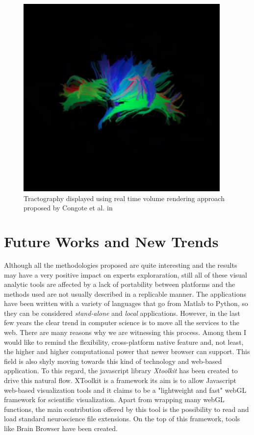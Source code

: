 \documentclass{article}
\begin{document}
\begin{multicols}{2}
\begin{figure}[H]
\centering
\includegraphics[width = 0.8\columnwidth]{realTimeTractography}
\caption{Tractography displayed using real time volume rendering approach proposed by Congote et al. in \cite{congote2012real}}
\label{gig:realtime}
\end{figure}


\section{Future Works and New Trends}
\label{sec:futureWorks}
Although all the methodologies proposed are quite interesting and the results may have a very positive impact on experts exploraration, still all of these visual analytic tools are affected by a lack of portability between platforms and the methods used are not usually described in a replicable manner. The applications have been written with a variety of languages that go from Matlab to Python, so they can be considered \textit{stand-alone} and \textit{local} applications. However, in the last few years the clear trend in computer science is to move all the services to the web. There are many reasons why we are witnessing this process. Among them I would like to remind the flexibility, cross-platform native feature and, not least, the higher and higher computational power that newer browser can support. This field is also shyly moving towards this kind of technology and web-based application. To this regard, the javascript library \textit{Xtoolkit} \cite{xToolkit} has been created to drive this natural flow. XToolkit is a framework its aim is to allow Javascript web-based visualization tools and it claims to be a "lightweight and fast" webGL framework for scientific visualization. Apart from wrapping many webGL functions, the main contribution offered by this tool is the possibility to read and load standard neuroscience file extensions. On the top of this framework, tools like Brain Browser \cite{brainBrowser} have been created. \\


\end{multicols}
\end{document}
